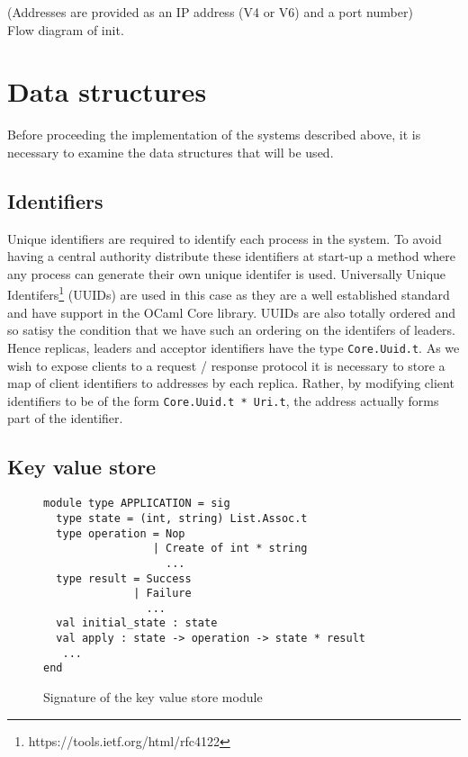 {\color{red}(Addresses are provided as an IP address (V4 or V6) and a port number)} \\

{\color{blue}Flow diagram of init}.


\section{Data structures}

Before proceeding the implementation of the systems described above, it is necessary to examine the data structures that will be used.

\subsection{Identifiers}

Unique identifiers are required to identify each process in the system. To avoid having a central authority distribute these identifiers at start-up a method where any process can generate their own unique identifer is used. Universally Unique Identifers\footnote{https://tools.ietf.org/html/rfc4122} (UUIDs) are used in this case as they are a well established standard and have support in the OCaml Core library. UUIDs are also totally ordered and so satisy the condition that we have such an ordering on the identifers of leaders. \\

Hence replicas, leaders and acceptor identifiers have the type \texttt{Core.Uuid.t}. As we wish to expose clients to a request / response protocol it is necessary to store a map of client identifiers to addresses by each replica. Rather, by modifying client identifiers to be of the form \texttt{Core.Uuid.t * Uri.t}, the address actually forms part of the identifier.

\subsection{Key value store}

\begin{figure}
  \begin{lstlisting}
module type APPLICATION = sig
  type state = (int, string) List.Assoc.t
  type operation = Nop                  
                 | Create of int * string  
                   ...          
  type result = Success 
              | Failure
                ...          
  val initial_state : state
  val apply : state -> operation -> state * result
   ...
end
  \end{lstlisting}
    \caption{Signature of the key value store module}
  \centering
\end{figure}



